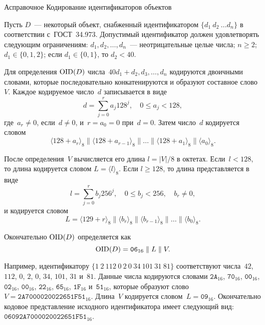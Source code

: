 \begin{appendix}{А}{справочное}
{Кодирование идентификаторов объектов}
\label{BER}

\mbox{}

Пусть $D$~--- некоторый объект, 
снабженный идентификатором $\{d_1\ d_2\ \ldots d_n\}$
в соответствии с~ГОСТ~34.973.
%
Допустимый идентификатор должен удовлетворять следующим ограничениям:
$d_1,d_2,\ldots,d_n$~--- неотрицательные целые числа;
$n\geq 2$; $d_1\in\{0,1,2\}$;
если $d_1\in\{0,1\}$, то $d_2<40$.

Для определения $\text{\normalfont OID}(D)$ числа~$40 d_1 + d_2,d_3,\ldots,d_n$ 
кодируются двоичными словами,
которые последовательно конкатенируются и образуют составное слово~$V$.
%
Каждое кодируемое число~$d$ записывается в виде 
$$
d=\sum_{j=0}^{r}a_j 128^j,\quad
0\leq a_j<128,
$$
где~$a_r\neq 0$, если~$d\neq 0$, и~$r=a_0=0$ при~$d=0$.
%
Затем число~$d$ кодируется словом
$$
\langle 128+a_r \rangle_8\parallel
\langle 128+a_{r-1} \rangle_8\parallel
\ldots\parallel
\langle 128+a_1 \rangle_8\parallel
\langle a_0 \rangle_8.
$$

После определения~$V$ вычисляется его длина $l=|V|/8$ в октетах.  
%
Если~$l<128$, то длина кодируется словом $L=\langle l\rangle_{8}$.
Если $l\geq 128$, то длина представляется в виде
$$
l=\sum_{j=0}^r b_j 256^j,\quad
0\leq b_j<256,\quad
b_r\neq 0,
$$
и кодируется словом 
$$
L=\langle 129+r\rangle_8\parallel
\langle b_r\rangle_8\parallel
\langle b_{r-1}\rangle_8\parallel\ldots\parallel
\langle b_0\rangle_8.
$$

Окончательно $\text{\normalfont OID}(D)$ определяется как
$$
\text{\normalfont OID}(D)=\texttt{06}_{16}\parallel L\parallel V.
$$

Например, идентификатору $\{1\ 2\ 112\ 0\ 2\ 0\ 34\ 101\ 31\ 81\}$
соответствуют числа~$42$, 
$112$, 
$0$, 
$2$, 
$0$, 
$34$, 
$101$, 
$31$ 
и~$81$.
Данные числа кодируются словами 
$\texttt{2A}_{16}$, 
$\texttt{70}_{16}$, 
$\texttt{00}_{16}$,
$\texttt{02}_{16}$,
$\texttt{00}_{16}$,
$\texttt{22}_{16}$,
$\texttt{65}_{16}$,
$\texttt{1F}_{16}$
и~$\texttt{51}_{16}$,
которые образуют слово~$V=\texttt{2A7000020022651F51}_{16}$.
Длина~$V$ кодируется словом~$L=\texttt{09}_{16}$.
Окончательно кодовое представление
исходного идентификатора имеет следующий вид: 
$\texttt{06092A7000020022651F51}_{16}$.

\end{appendix}

